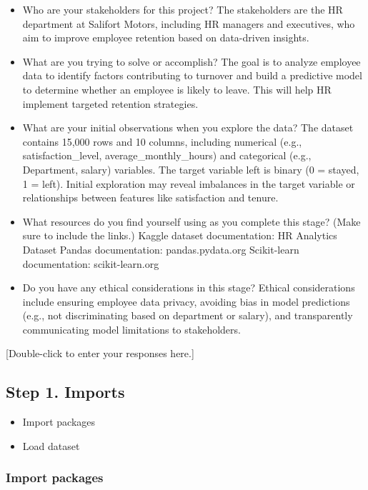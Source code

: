 \documentclass[11pt]{article}
\providecommand{\tightlist}{%
      \setlength{\itemsep}{0pt}\setlength{\parskip}{0pt}}
\begin{document}
\begin{itemize}
\item
  Who are your stakeholders for this project? The stakeholders are the
  HR department at Salifort Motors, including HR managers and
  executives, who aim to improve employee retention based on data-driven
  insights.
\item
  What are you trying to solve or accomplish? The goal is to analyze
  employee data to identify factors contributing to turnover and build a
  predictive model to determine whether an employee is likely to leave.
  This will help HR implement targeted retention strategies.
\item
  What are your initial observations when you explore the data? The
  dataset contains 15,000 rows and 10 columns, including numerical
  (e.g., satisfaction\_level, average\_monthly\_hours) and categorical
  (e.g., Department, salary) variables. The target variable left is
  binary (0 = stayed, 1 = left). Initial exploration may reveal
  imbalances in the target variable or relationships between features
  like satisfaction and tenure.
\item
  What resources do you find yourself using as you complete this stage?
  (Make sure to include the links.) Kaggle dataset documentation: HR
  Analytics Dataset Pandas documentation: pandas.pydata.org Scikit-learn
  documentation: scikit-learn.org
\item
  Do you have any ethical considerations in this stage? Ethical
  considerations include ensuring employee data privacy, avoiding bias
  in model predictions (e.g., not discriminating based on department or
  salary), and transparently communicating model limitations to
  stakeholders.
\end{itemize}

    {[}Double-click to enter your responses here.{]}

    \hypertarget{step-1.-imports}{%
\subsection{Step 1. Imports}\label{step-1.-imports}}

\begin{itemize}
\tightlist
\item
  Import packages
\item
  Load dataset
\end{itemize}

    \hypertarget{import-packages}{%
\subsubsection{Import packages}\label{import-packages}}
\end{document}
